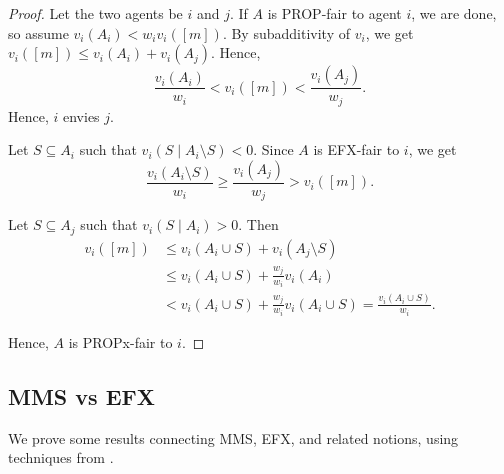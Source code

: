 \begin{proof}
Let the two agents be $i$ and $j$.
If $A$ is PROP-fair to agent $i$, we are done, so assume $v_i(A_i) < w_iv_i([m])$.
By subadditivity of $v_i$, we get $v_i([m]) \le v_i(A_i) + v_i(A_j)$. Hence,
\[ \frac{v_i(A_i)}{w_i} < v_i([m]) < \frac{v_i(A_j)}{w_j}. \]
Hence, $i$ envies $j$.

Let $S \subseteq A_i$ such that $v_i(S \mid A_i \setminus S) < 0$.
Since $A$ is EFX-fair to $i$, we get
\[ \frac{v_i(A_i \setminus S)}{w_i} \ge \frac{v_i(A_j)}{w_j} > v_i([m]). \]

Let $S \subseteq A_j$ such that $v_i(S \mid A_i) > 0$. Then
\begin{align*}
v_i([m]) &\le v_i(A_i \cup S) + v_i(A_j \setminus S)
    \tag{$v_i$ is subadditive}
\\ &\le v_i(A_i \cup S) + \frac{w_j}{w_i}v_i(A_i)
    \tag{$A$ is EFX-fair to $i$}
\\ &< v_i(A_i \cup S) + \frac{w_j}{w_i}v_i(A_i \cup S)
    = \frac{v_i(A_i \cup S)}{w_i}.
\end{align*}

Hence, $A$ is PROPx-fair to $i$.
\end{proof}

\subsection{MMS vs EFX}
\label{sec:impls-extra:mms-vs-efx}

We prove some results connecting MMS, EFX, and related notions,
using techniques from \citet{plaut2020almost,caragiannis2023new}.


